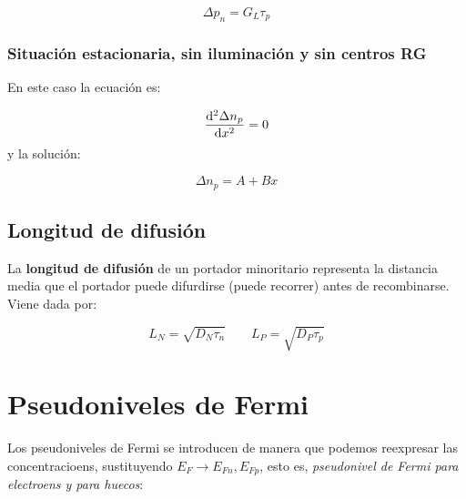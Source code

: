 \begin{equation}
	\Delta p_n = G_L \tau_p
\end{equation}

\subsubsection{Situación estacionaria, sin iluminación y sin centros RG}
En este caso la ecuación es: 

\begin{equation}
	\frac{\mathrm{d} ^2 \Delta n_p}{\mathrm{d} x^2} = 0 
\end{equation}
y la solución: 

\begin{equation}
	\Delta n_p = A + Bx
\end{equation}

\subsection{Longitud de difusión}

La \textbf{longitud de difusión} de un portador minoritario representa la distancia media que el portador puede difurdirse (puede recorrer) antes de recombinarse. Viene dada por:

\begin{equation}
	L_N = \sqrt{D_N \tau_n} \qquad  L_P = \sqrt{D_P \tau_p}
\end{equation}




\section{Pseudoniveles de Fermi}

Los pseudoniveles de Fermi se introducen de manera que podemos reexpresar las concentracioens, sustituyendo $E_F\rightarrow E_{Fn},E_{Fp}$, esto es, \textit{pseudonivel de Fermi para electroens y para huecos}:

